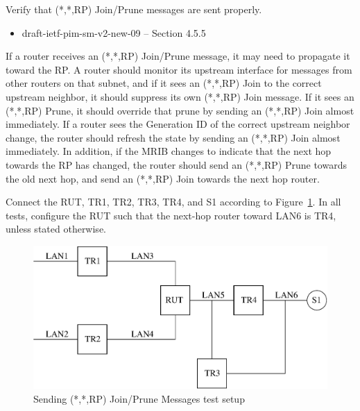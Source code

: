 \documentclass[11pt]{report}
\begin{document}
Verify that (*,*,RP) Join/Prune messages are sent properly.

\begin{itemize}
  \item draft-ietf-pim-sm-v2-new-09 -- Section 4.5.5
\end{itemize}

If a router receives an (*,*,RP) Join/Prune message, it may need to propagate
it toward the RP. A router should monitor its upstream interface for messages
from other routers on that subnet, and if it sees an (*,*,RP) Join to the
correct upstream neighbor, it should suppress its own (*,*,RP) Join message.
If it sees an (*,*,RP) Prune, it should override that prune by sending an
(*,*,RP) Join almost immediately. If a router sees the Generation ID of the
correct upstream neighbor change, the router should refresh the state by
sending an (*,*,RP) Join almost immediately. In addition, if the MRIB changes
to indicate that the next hop towards the RP has changed, the router should
send an (*,*,RP) Prune towards the old next hop, and send an (*,*,RP) Join
towards the next hop router.

Connect the RUT, TR1, TR2, TR3, TR4, and S1 according to
Figure~\ref{fig:pim_test_4_5_sending_rp_join_prune_messages}.
In all tests, configure the RUT such that the next-hop router toward LAN6 is
TR4, unless stated otherwise.

\begin{figure}[htbp]
  \begin{center}
    \includegraphics[scale=0.8]{figs/pim_test_4_5_sending_rp_join_prune_messages}
    \caption{Sending (*,*,RP) Join/Prune Messages test setup}
    \label{fig:pim_test_4_5_sending_rp_join_prune_messages}
  \end{center}
\end{figure}
\end{document}

